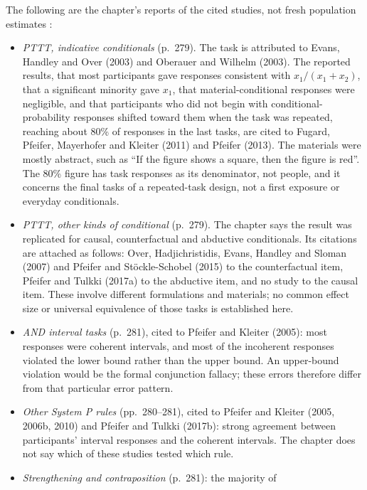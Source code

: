 The following are the chapter's reports of the cited studies, not fresh
population estimates \cite[pp.~278--281]{Pfeifer2021ProbabilityLogic}:
\begin{itemize}
\item \emph{PTTT, indicative conditionals} (p.~279). The task is
      attributed to Evans, Handley and Over (2003) and Oberauer and
      Wilhelm (2003). The reported results, that most participants gave
      responses consistent with \(x_1/(x_1+x_2)\), that a significant
      minority gave \(x_1\), that material-conditional responses were
      negligible, and that participants who did not begin with
      conditional-probability responses shifted toward them when the
      task was repeated, reaching about 80\% of responses in the last
      tasks, are cited to Fugard, Pfeifer, Mayerhofer and Kleiter (2011)
      and Pfeifer (2013). The materials were mostly abstract, such as
      ``If the figure shows a square, then the figure is red''. The
      80\% figure has task responses as its denominator, not people,
      and it concerns the final tasks of a repeated-task design, not a
      first exposure or everyday conditionals.
\item \emph{PTTT, other kinds of conditional} (p.~279). The chapter
      says the result was replicated for causal, counterfactual and
      abductive conditionals. Its citations are attached as follows:
      Over, Hadjichristidis, Evans, Handley and Sloman (2007) and
      Pfeifer and St\"ockle-Schobel (2015) to the counterfactual item,
      Pfeifer and Tulkki (2017a) to the abductive item, and no study
      to the causal item. These involve different formulations and
      materials; no common effect size or universal equivalence of
      those tasks is established here.
\item \emph{AND interval tasks} (p.~281), cited to Pfeifer and Kleiter
      (2005): most responses were coherent intervals, and most of the
      incoherent responses violated the lower bound rather than the
      upper bound. An upper-bound violation would be the formal
      conjunction fallacy; these errors therefore differ from that
      particular error pattern.
\item \emph{Other System P rules} (pp.~280--281), cited to Pfeifer and
      Kleiter (2005, 2006b, 2010) and Pfeifer and Tulkki (2017b): strong
      agreement between participants' interval responses and the
      coherent intervals. The chapter does not say which of these
      studies tested which rule.
\item \emph{Strengthening and contraposition} (p.~281): the majority of

\end{itemize}
